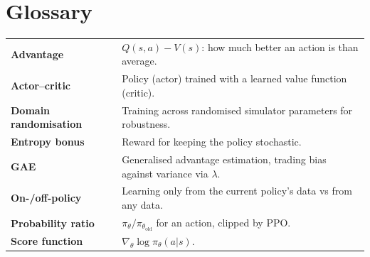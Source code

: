 \documentclass[11pt]{article}
\begin{document}
\section{Glossary}
\begin{center}\small\renewcommand{\arraystretch}{1.2}
\begin{tabularx}{\textwidth}{>{\bfseries}p{3.3cm}X}\toprule
Advantage & $Q(s,a)-V(s)$: how much better an action is than average.\\
Actor--critic & Policy (actor) trained with a learned value function (critic).\\
Domain randomisation & Training across randomised simulator parameters for robustness.\\
Entropy bonus & Reward for keeping the policy stochastic.\\
GAE & Generalised advantage estimation, trading bias against variance via $\lambda$.\\
On-/off-policy & Learning only from the current policy's data vs from any data.\\
Probability ratio & $\pi_\theta/\pi_{\theta_{\text{old}}}$ for an action, clipped by PPO.\\
Score function & $\nabla_\theta\log\pi_\theta(a|s)$.\\\bottomrule
\end{tabularx}\end{center}
\end{document}
